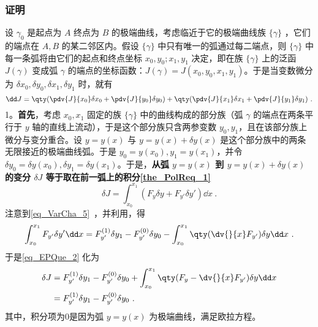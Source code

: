 \subsubsection{证明}
设 $\gamma_0$ 是起点为 $A$ 终点为 $B$ 的极端曲线，考虑临近于它的极端曲线族 $\{\gamma\}$ ，它们的端点在 $A,B$ 的某二邻区内。假设 $\{\gamma\}$ 中只有唯一的弧通过每二端点，则 $\{\gamma\}$ 中每一条弧将由它们的起点和终点坐标 $x_0,y_0;x_1,y_1$ 决定，即在族 $\{\gamma\}$ 上的泛函 $J(\gamma)$ 变成弧 $\gamma$ 的端点的坐标函数：$J(\gamma)=J(x_0,y_0,x_1,y_1)$。于是当变数微分为 $\delta x_0,\delta y_0,\delta x_1,\delta y_1$ 时，就有
\begin{equation}
\dd J=\qty(\pdv{J}{x_0}\delta x_0+\pdv{J}{y_0}\delta y_0)+\qty(\pdv{J}{x_1}\delta x_1+\pdv{J}{y_1}\delta y_1)~.
\end{equation}
1。\textbf{首先}，考虑 $x_0,x_1$ 固定的族 $\{\gamma\}$ 中的曲线构成的部分族（弧 $\gamma$ 的端点在两条平行于 $y$ 轴的直线上流动），于是这个部分族只含两参变数 $y_0,y_1$，且在该部分族上微分与变分重合。设 $y=y(x)$ 与 $y=y(x)+\delta y(x)$ 是这个部分族中的两条无限接近的极端曲线弧。于是 $y_0=y(x_0),y_1=y(x_1)$，并令 $\delta y_0=\delta y(x_0),\delta y_1=\delta y(x_1)$。于是，\textbf{从弧 $y=y(x)$ 到 $y=y(x)+\delta y(x)$ 的变分 $\delta J$ 等于取在前一弧上的积分\autoref{the_PolReq_1}~}
\begin{equation}\label{eq_EPQue_2}
\delta J=\int_{x_0}^{x_1}(F_{y}\delta y+F_{y'}\delta y')\dd x~.
\end{equation}
注意到\autoref{eq_VarCha_5}~，并利用，得
\begin{equation}
\int_{x_0}^{x_1}F_{y'}\delta y' \dd x=F_{y'}^{(1)}\delta y_1-F_{y'}^{(0)}\delta y_0-\int_{x_0}^{x_1}\qty(\dv{}{x}F_{y'})\delta y\dd x~.
\end{equation}
于是\autoref{eq_EPQue_2} 化为
\begin{equation}
\begin{aligned}
\delta J&=F_{y'}^{(1)}\delta y_1-F_{y'}^{(0)}\delta y_0+\int_{x_0}^{x_1}\qty(F_y-\dv{}{x}F_{y'})\delta y\dd x\\
&=F_{y'}^{(1)}\delta y_1-F_{y'}^{(0)}\delta y_0~.
\end{aligned}
\end{equation}
其中，积分项为0是因为弧 $y=y(x)$ 为极端曲线，满足欧拉方程。

